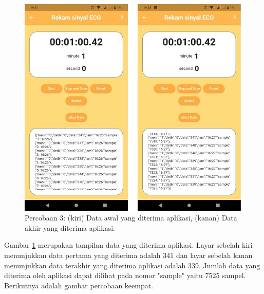 \begin{figure}[!h] \centering
	\includegraphics[width=1\textwidth]{img/percob/Slide13}
	\caption{Percobaan 3: (kiri) Data awal yang diterima aplikasi, (kanan) Data akhir yang diterima aplikasi.}
	\label{fig:4.2.4}
\end{figure}
Gambar \ref{fig:4.2.4} merupakan tampilan data yang diterima aplikasi. Layar sebelah kiri menunjukkan data pertama yang diterima adalah 341 dan layar sebelah kanan menunjukkan data terakhir yang diterima aplikasi adalah 339. Jumlah data yang diterima oleh aplikasi dapat dilihat pada nomor "sample" yaitu 7525 sampel. Berikutnya adalah gambar percobaan keempat. 
